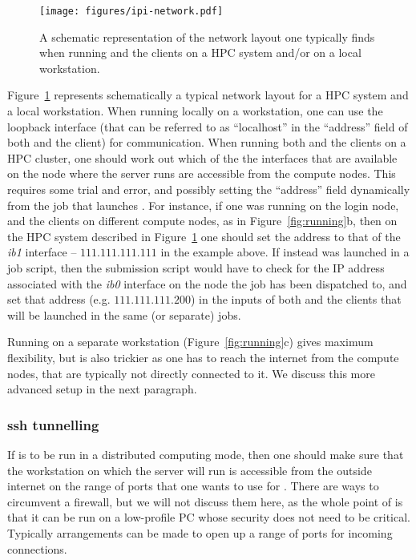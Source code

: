 \documentclass[11pt,english,fleqn]{report}
\begin{document}
\begin{figure}[hbt]
\centering\texttt{[image: figures/ipi-network.pdf]}
\caption{\label{fig:network} A schematic representation of the network layout one 
typically finds when running \ipi and the clients on a HPC system and/or on a local workstation. } 
\end{figure}

Figure~\ref{fig:network} represents schematically a typical network layout
for a HPC system and a local workstation. When running \ipi locally on a 
workstation, one can use the loopback interface (that can be referred to as 
``localhost'' in the ``address'' field of both \ipi and the client) for communication.
When running both \ipi and the clients on a HPC cluster, one should work out which of the
the interfaces that are available on the node where the \ipi server runs are accessible from the
compute nodes. This requires some trial and error, and possibly setting the 
 ``address'' field dynamically from the job that launches \ipi. 
 For instance,
if one was running \ipi on the login node, and the clients on different compute nodes, as 
in Figure~\ref{fig:running}b, then on the HPC system described in Figure~\ref{fig:network} 
one should set the address to that of the \emph{ib1} interface -- $111.111.111.111$ in 
the example above. If instead \ipi was launched in a job script, then the submission script would
have to check for the IP address associated with the \emph{ib0} interface on the node
the job has been dispatched to, and set that address (e.g. $111.111.111.200$) in the inputs
of both \ipi and the clients that will be launched in the same (or separate) jobs.

Running \ipi on a separate workstation (Figure~\ref{fig:running}c) gives 
maximum flexibility, but is also trickier as one has to reach the 
internet from the compute nodes, that are typically not directly connected to it. 
We discuss this more advanced setup in the next paragraph.

\subsubsection{ssh tunnelling}

\label{ssh_sockets}

If \ipi is to be run in a distributed computing mode, then one should
make sure that the workstation on which the server will run is accessible from
the outside internet on the range of ports that one wants to use for
\ipi. There are ways to circumvent a firewall, but we will not discuss them
here, as the whole point of \ipi is that it can be run on a low-profile
PC whose security does not need to be critical. Typically arrangements
can be made to open up a range of ports for incoming connections. 
\end{document}
